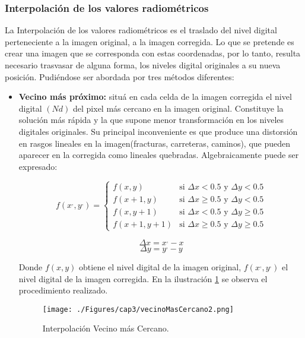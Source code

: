 \subsubsection{Interpolaci\'on de los valores radiom\'etricos}
La Interpolaci\'on de los valores radiom\'etricos es el traslado del nivel digital perteneciente a la imagen original, a la imagen corregida. Lo que se pretende es crear una imagen que se corresponda con estas coordenadas, por lo tanto, resulta necesario trasvasar de alguna forma, los niveles digital originales a su nueva posici\'on. Pudi\'endose ser abordada por tres m\'etodos diferentes:
	\begin{itemize}
		\item \textbf{Vecino m\'as pr\'oximo:} situ\'a en cada celda de la imagen corregida el nivel digital $ (Nd) $ del pixel m\'as cercano en la imagen original. Constituye la soluci\'on m\'as r\'apida y la que supone menor transformaci\'on en los niveles digitales originales. Su principal inconveniente es que produce una distorsi\'on en rasgos lineales en la imagen(fracturas, carreteras, caminos), que pueden aparecer en la corregida como lineales quebradas. Algebraicamente puede ser expresado:
		
\begin{equation}
	f(x^{,},y^{,}) = \begin{cases}
		f(x,y) & \text{si }\Delta x < 0.5 \text{ y } \Delta y < 0.5\\
		f(x+1,y) & \text{si } \Delta x \geq 0.5 \text{ y } \Delta y < 0.5\\
		f(x,y+1) & \text{si } \Delta x < 0.5 \text{ y } \Delta y \geq 0.5\\
		f(x+1,y+1) & \text{si } \Delta x \geq 0.5 \text{ y } \Delta y \geq 0.5
	\end{cases}
\end{equation}	

\begin{equation}
	\Delta x = x^{,}-x
\end{equation}	
\begin{equation}
	\Delta y = y^{,}-y
\end{equation}	

		Donde $ f(x,y) $ obtiene el nivel digital de la imagen original, $ f(x^{,},y^{,}) $ el nivel digital de la imagen corregida. En la ilustraci\'on \ref{fig:vecinoMasCercano2} se observa el procedimiento realizado.
				    \begin{figure}[H]
				    	\centering
				    	\texttt{[image: ./Figures/cap3/vecinoMasCercano2.png]}
				    	\caption{Interpolaci\'on Vecino m\'as Cercano.}
				    	\label{fig:vecinoMasCercano2}
				    \end{figure}
		

\end{itemize}
